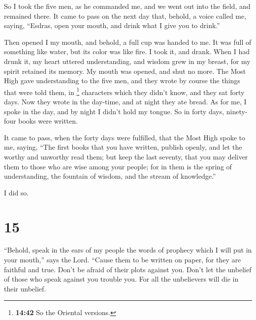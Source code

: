  So I took the five men, as he commanded me, and we went
out into the field, and remained there.  It came to pass
on the next day that, behold, a voice called me, saying, ``Esdras, open
your mouth, and drink what I give you to drink.''

 Then opened I my mouth, and behold, a full cup was
handed to me. It was full of something like water, but its color was
like fire.  I took it, and drank. When I had drunk it, my
heart uttered understanding, and wisdom grew in my breast, for my spirit
retained its memory.  My mouth was opened, and shut no
more.  The Most High gave understanding to the five men,
and they wrote by course the things that were told them, in \footnote{\textbf{14:42}
  So the Oriental versions.} characters which they didn't know, and they
sat forty days. Now they wrote in the day-time, and at night they ate
bread.  As for me, I spoke in the day, and by night I
didn't hold my tongue.  So in forty days, ninety-four
books were written.

 It came to pass, when the forty days were fulfilled,
that the Most High spoke to me, saying, ``The first books that you have
written, publish openly, and let the worthy and unworthy read them;
 but keep the last seventy, that you may deliver them to
those who are wise among your people;  for in them is the
spring of understanding, the fountain of wisdom, and the stream of
knowledge.''

 I did so.

\hypertarget{section-14}{%
\section{15}\label{section-14}}

 ``Behold, speak in the ears of my people the words of
prophecy which I will put in your mouth,'' says the Lord. 
``Cause them to be written on paper, for they are faithful and true.
 Don't be afraid of their plots against you. Don't let the
unbelief of those who speak against you trouble you.  For
all the unbelievers will die in their unbelief.


